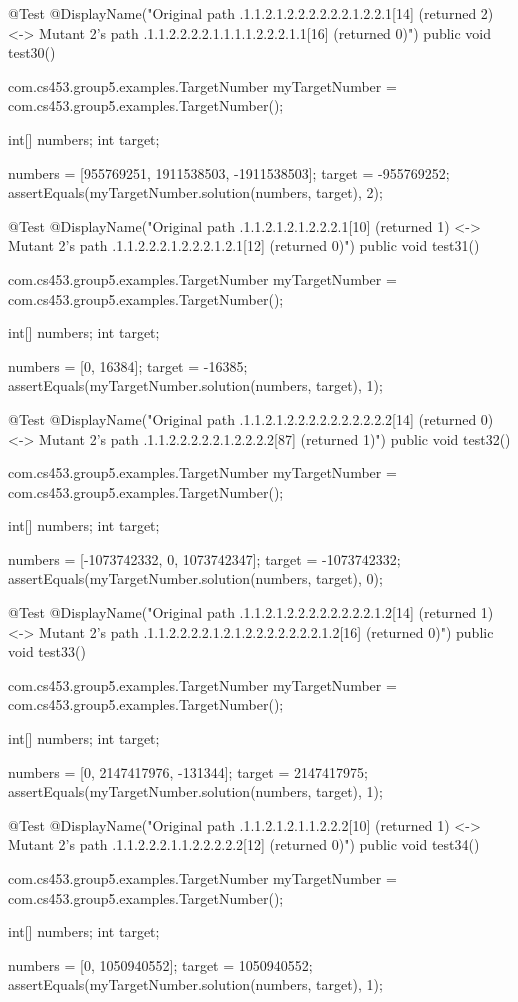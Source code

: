 @Test
@DisplayName("Original path .1.1.2.1.2.2.2.2.2.2.1.2.2.1[14] (returned 2) <-> Mutant 2's path .1.1.2.2.2.2.1.1.1.1.2.2.2.1.1[16] (returned 0)")
public void test30() {
    com.cs453.group5.examples.TargetNumber myTargetNumber = com.cs453.group5.examples.TargetNumber();

    int[] numbers;
    int target;

    numbers = [955769251, 1911538503, -1911538503];
    target = -955769252;
    assertEquals(myTargetNumber.solution(numbers, target), 2);
}

@Test
@DisplayName("Original path .1.1.2.1.2.1.2.2.2.1[10] (returned 1) <-> Mutant 2's path .1.1.2.2.2.1.2.2.2.1.2.1[12] (returned 0)")
public void test31() {
    com.cs453.group5.examples.TargetNumber myTargetNumber = com.cs453.group5.examples.TargetNumber();

    int[] numbers;
    int target;

    numbers = [0, 16384];
    target = -16385;
    assertEquals(myTargetNumber.solution(numbers, target), 1);
}

@Test
@DisplayName("Original path .1.1.2.1.2.2.2.2.2.2.2.2.2.2[14] (returned 0) <-> Mutant 2's path .1.1.2.2.2.2.2.1.2.2.2.2[87] (returned 1)")
public void test32() {
    com.cs453.group5.examples.TargetNumber myTargetNumber = com.cs453.group5.examples.TargetNumber();

    int[] numbers;
    int target;

    numbers = [-1073742332, 0, 1073742347];
    target = -1073742332;
    assertEquals(myTargetNumber.solution(numbers, target), 0);
}

@Test
@DisplayName("Original path .1.1.2.1.2.2.2.2.2.2.2.2.1.2[14] (returned 1) <-> Mutant 2's path .1.1.2.2.2.2.1.2.1.2.2.2.2.2.2.2.1.2[16] (returned 0)")
public void test33() {
    com.cs453.group5.examples.TargetNumber myTargetNumber = com.cs453.group5.examples.TargetNumber();

    int[] numbers;
    int target;

    numbers = [0, 2147417976, -131344];
    target = 2147417975;
    assertEquals(myTargetNumber.solution(numbers, target), 1);
}

@Test
@DisplayName("Original path .1.1.2.1.2.1.1.2.2.2[10] (returned 1) <-> Mutant 2's path .1.1.2.2.2.1.1.2.2.2.2.2[12] (returned 0)")
public void test34() {
    com.cs453.group5.examples.TargetNumber myTargetNumber = com.cs453.group5.examples.TargetNumber();

    int[] numbers;
    int target;

    numbers = [0, 1050940552];
    target = 1050940552;
    assertEquals(myTargetNumber.solution(numbers, target), 1);
}

